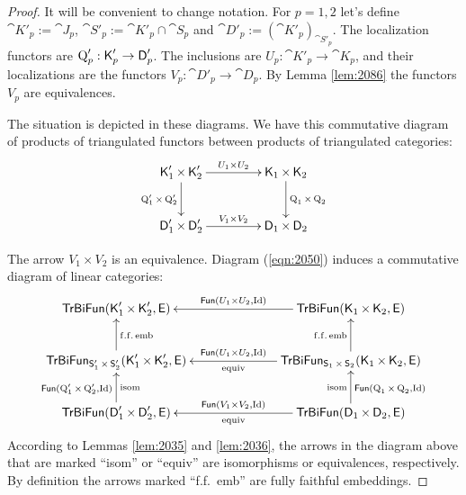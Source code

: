 \begin{proof}
It will be convenient to change notation.
For $p = 1, 2$ let's define 
$\cat{K}'_p := \cat{J}_p$, $\cat{S}'_p := \cat{K}'_p \cap \cat{S}_p$ and
$\cat{D}'_p := (\cat{K}'_p)_{\cat{S}'_p}$. 
The localization functors are 
$\operatorname{Q}'_p : \operatorname{\mathsf{K}}'_p \to \operatorname{\mathsf{D}}'_p$. 
The inclusions are 
$U_p : \cat{K}'_p \to \cat{K}_p$, and their localizations are the functors 
$V_p : \cat{D}'_p \to \cat{D}_p$.
By Lemma \ref{lem:2086} the functors $V_p$ are equivalences.

The situation is depicted in these diagrams. 
We have this commutative diagram of 
products of triangulated functors between products of triangulated 
categories:
\begin{equation} \label{eqn:2050}
\UseTips \xymatrix @C=10ex @R=6ex {
\cat{K}'_1 \times \cat{K}'_2
\ar[r]^{U_1 \times U_2}
\ar[d]_{\opn{Q}'_1 \times \opn{Q}'_2}
&
\cat{K}_1 \times \cat{K}_2
\ar[d]^{\opn{Q}_1 \times \opn{Q}_2}
\\
\cat{D}'_1 \times \cat{D}'_2
\ar[r]^{V_1 \times V_2}
&
\cat{D}_1 \times \cat{D}_2
} 
\end{equation}

\noindent 
The arrow $V_1 \times V_2$ is an equivalence. 
Diagram (\ref{eqn:2050}) induces a commutative diagram of linear categories:
\begin{equation} \label{eqn:2051}
\UseTips \xymatrix @C=16ex @R=5.5ex {
\cat{TrBiFun}(\cat{K}'_1 \times \cat{K}'_2, \cat{E})
&
\cat{TrBiFun}(\cat{K}_1 \times \cat{K}_2, \cat{E})
\ar[l]_{\cat{Fun}(U_1 \times U_2, \opn{Id})}
\\
\cat{TrBiFun}_{\cat{S}'_1 \times \cat{S}'_2}
(\cat{K}'_1 \times \cat{K}'_2, \cat{E})
\ar[u]_{\mrm{f.f.\, emb}}
&
\cat{TrBiFun}_{\cat{S}_1 \times \cat{S}_2}
(\cat{K}_1 \times \cat{K}_2, \cat{E})
\ar[u]^{\mrm{f.f.\, emb}}
\ar[l]^{\mrm{equiv}}_{\cat{Fun}(U_1 \times U_2, \opn{Id})}
\\
\cat{TrBiFun}(\cat{D}'_1 \times \cat{D}'_2, \cat{E})
\ar[u]^(0.47){\cat{Fun}(\opn{Q}'_1 \times \opn{Q}'_2, \opn{Id})}_{\mrm{isom}}
&
\cat{TrBiFun}(\cat{D}_1 \times \cat{D}_2, \cat{E})
\ar[l]_{\cat{Fun}(V_1 \times V_2, \opn{Id})}^{\mrm{equiv}}
\ar[u]_(0.47){\cat{Fun}(\opn{Q}_1 \times \opn{Q}_2, \opn{Id})}^{\mrm{isom}}
} 
\end{equation}
According to Lemmas \ref{lem:2035} and \ref{lem:2036}, the arrows in the 
diagram above that are marked ``isom'' or ``equiv'' are isomorphisms or 
equivalences, respectively. By definition the arrows marked ``f.f.\ emb'' are 
fully faithful embeddings. 


\end{proof}
